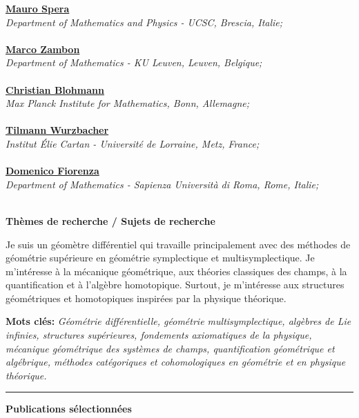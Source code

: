 \documentclass[a4paper]{article}
\newcommand{\block}[1]{\hrule \vspace{0.2cm} \textbf{\Large #1} \vspace{0.2cm}}
\newcommand{\blockNp}[1]{\newpage \textbf{\Large #1} \vspace{0.2cm}}
\newcommand{\voice}[5]{\href{#4}{\textbf{#1}} \hfill #2 \\ \textit{#3} \\ {\small #5} \vspace{0.2cm} \\}
\begin{document}
\begin{minipage}[t]{0.375\columnwidth}
    
    \voice{Mauro Spera}
        {}
        {Department of Mathematics and Physics - UCSC, Brescia, Italie;}
        {http://docenti.unicatt.it/ita/mauro_spera/}       
        {\vspace{-0.5cm}}
    \voice{Marco Zambon}
        {}
        {Department of Mathematics - KU Leuven, Leuven, Belgique;}
        {https://perswww.kuleuven.be/~u0096206/}       
        {\vspace{-0.5cm}}
    \voice{Christian Blohmann}
        {}
        {Max Planck Institute for Mathematics, Bonn, Allemagne;}
        {http://people.mpim-bonn.mpg.de/blohmann/}       
        {\vspace{-0.5cm}}
    \voice{Tilmann Wurzbacher}
        {}
        {Institut \'Elie Cartan - Universit\'e de Lorraine, Metz, France;}
        {https://iecl.univ-lorraine.fr/membre-iecl/wurzbacher-tilmann/}       
        {\vspace{-0.5cm}}
    \voice{Domenico Fiorenza}
        {}
        {Department of Mathematics - Sapienza Università di Roma, Rome, Italie;}
        {https://research.uniroma1.it/researcher/127cc95b4c09611e93641941dbd6d74ef318c7b45accf7992e4a914f}       
        {\vspace{-0.5cm}}
        



\end{minipage}


\blockNp{Thèmes de recherche / Sujets de recherche}

{Je suis un géomètre différentiel qui travaille principalement avec des méthodes de géométrie supérieure en géométrie symplectique et multisymplectique. Je m'intéresse à la mécanique géométrique, aux théories classiques des champs, à la quantification et à l'algèbre homotopique. Surtout, je m'intéresse aux structures géométriques et homotopiques inspirées par la physique théorique.\vspace{0.25em}

\textbf{Mots clés: }\it Géométrie différentielle, géométrie multisymplectique, algèbres de Lie infinies, structures supérieures, fondements axiomatiques de la physique, mécanique géométrique des systèmes de champs, quantification géométrique et algébrique, méthodes catégoriques et cohomologiques en géométrie et en physique théorique.}

\vspace{0.3cm}

\block{Publications sélectionnées}
\nocite{Miti2021,Miti2019,Miti2019a}
\printbibliography[heading=none]
\vspace{.5em}
\end{document}
